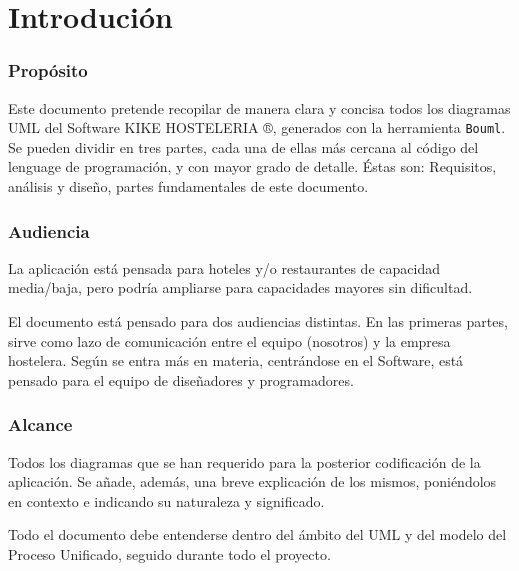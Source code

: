 \documentclass[spanish,a4paper,11pt, twoside]{report}	%
\begin{document}
\newpage
\mbox{}
\thispagestyle{empty}						%
\newpage


\tableofcontents 							%



\setcounter{section}{0}
\part{Introdución}
	\section{Propósito}
	Este documento pretende recopilar de manera clara y concisa todos los diagramas UML del Software KIKE HOSTELERIA ®, generados con la herramienta \texttt{Bouml}. Se pueden dividir en tres partes, cada una de ellas más cercana al código del lenguage de programación, y con mayor grado de detalle. Éstas son: Requisitos, análisis y diseño, partes fundamentales de este documento.

	\section{Audiencia} 
	La aplicación está pensada para hoteles y/o restaurantes de capacidad media/baja, pero podría ampliarse para capacidades mayores sin dificultad.

	El documento está pensado para dos audiencias distintas. En las primeras partes, sirve como lazo de comunicación entre el equipo (nosotros) y la empresa hostelera. Según se entra más en materia, centrándose en el Software, está pensado para el equipo de diseñadores y programadores.

	\section{Alcance}
	Todos los diagramas que se han requerido para la posterior codificación de la aplicación. Se añade, además, una breve explicación de los mismos, poniéndolos en contexto e indicando su naturaleza y significado.

	Todo el documento debe entenderse dentro del ámbito del UML y del modelo del Proceso Unificado, seguido durante todo el proyecto.
\end{document}
